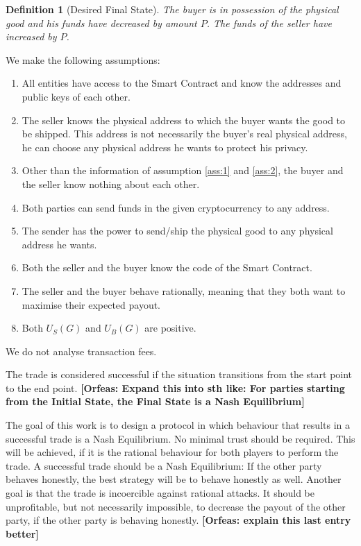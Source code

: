 \documentclass{cacthesis}
\newcommand{\authnote}[3]{{ \footnotesize \textbf{#1[#2: #3]~}}}
\newcommand{\orfnote}[1]{\authnote{\color{blue}}{Orfeas}{#1}}
\newtheorem{definition}{Definition}
\begin{document}
\begin{definition}[Desired Final State]
\label{def:desired-final-state}
The buyer is in possession of the physical good and his funds have decreased by amount $P$. The funds of the seller have increased by $P$.
\end{definition}


We make the following assumptions:
\begin{enumerate}
    \item All entities have access to the Smart Contract and know the addresses and public keys of each other.
    \label{ass:1}
    \item The seller knows the physical address to which the buyer wants the good to be shipped. This address is not necessarily the buyer's real physical address, he can choose any physical address he wants to protect his privacy.
    \label{ass:2}
    \item Other than the information of assumption \ref{ass:1} and \ref{ass:2}, the buyer and the seller know nothing about each other.
    \label{ass:3}
    \item Both parties can send funds in the given cryptocurrency to any address.
    \label{ass:4}
    \item The sender has the power to send/ship the physical good to any physical address he wants.
    \label{ass:5}
    \item Both the seller and the buyer know the code of the Smart Contract.
    \label{ass:6}
    \item The seller and the buyer behave rationally, meaning that they both want to maximise their expected payout.
    \item Both $U_S(G)$ and $U_B(G)$ are positive. 
\end{enumerate}

We do not analyse transaction fees. 

The trade is considered successful if the situation transitions from the start
point to the end point. \orfnote{Expand this into sth like: For parties starting
from the Initial State, the Final State is a Nash Equilibrium}

The goal of this work is to design a protocol in which behaviour that results in a successful trade is a Nash Equilibrium.\newline
No minimal trust should be required. This will be achieved, if it is the rational behaviour for both players to perform the trade. A successful trade should be a Nash Equilibrium: If the other party behaves honestly, the best strategy will be to behave honestly as well.\newline
Another goal is that the trade is incoercible against rational attacks. It
should be unprofitable, but not necessarily impossible, to decrease the payout
of the other party, if the other party is behaving honestly. \orfnote{explain
this last entry better}
\end{document}
